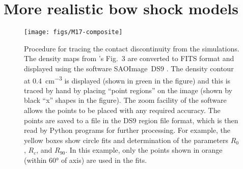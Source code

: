 \documentclass[useAMS, usenatbib, a4paper]{mnras}
\begin{document}


% 
\section{More realistic bow shock models}
\label{sec:more-realistic-bow}

\begin{figure}
  \centering
  \texttt{[image: figs/M17-composite]}
  \caption[]{Procedure for tracing the contact discontinuity from the
    \citet{Meyer:2017a} simulations.  The density maps from
    \citeauthor{Meyer:2017a}'s Fig.~3 are converted to FITS format and
    displayed using the software SAOImage~DS9 \citep{Joye:2003a}.  The
    density contour at \SI{0.4}{cm^{-3}} is displayed (shown in green
    in the figure) and this is traced by hand by placing ``point
    regions'' on the image (shown by black ``x'' shapes in the
    figure).  The zoom facility of the software allows the points to
    be placed with any required accuracy.  The points are saved to a
    file in the DS9 region file format, which is then read by Python
    programs for further processing.  For example, the yellow boxes
    show circle fits and determination of the parameters \(R_0\),
    \(R_c\), and \(R_{90}\).  In this example, only the points shown
    in orange (within \ang{60} of axis) are used in the fits.}
  \label{fig:meyer-trace}
\end{figure}
\end{document}
